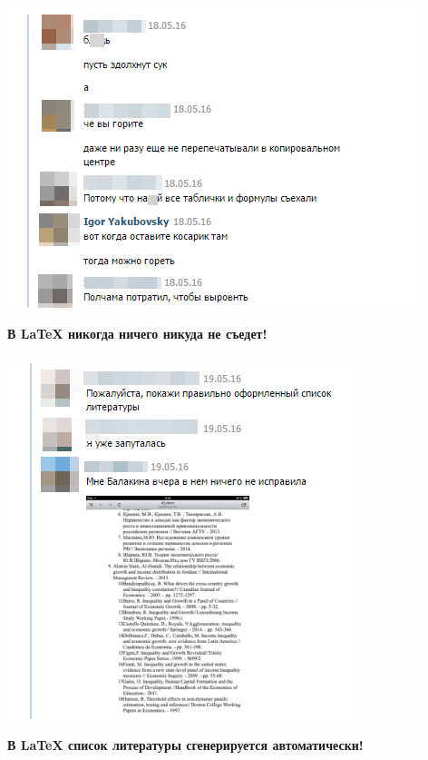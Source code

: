 \documentclass[newPxFont]{beamer}
\begin{document}
\begin{frame}
\frametitle{\insertsection} 

	\centering
    \includegraphics[height=0.7\textheight]{m1.png}
    
    
    \alert{\textbf{В \LaTeX{} никогда ничего никуда не съедет!}}
    
    
\end{frame}

\begin{frame}
\frametitle{\insertsection} 
    \centering
    \includegraphics[height=0.7\textheight]{m2.png}
    
    \vfill
    \alert{\textbf{В \LaTeX{} список литературы сгенерируется автоматически!}}
\end{frame}
\end{document}
